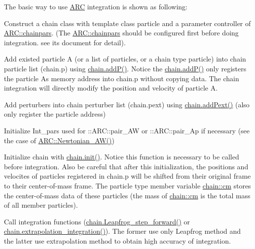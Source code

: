 The basic way to use \hyperlink{namespaceARC}{A\+RC} integration is shown as following\+:
\begin{DoxyEnumerate}
\item Construct a chain class with template class particle and a parameter controller of \hyperlink{classARC_1_1chainpars}{A\+R\+C\+::chainpars}. (The \hyperlink{classARC_1_1chainpars}{A\+R\+C\+::chainpars} should be configured first before doing integration. see its document for detail).
\item Add existed particle \textquotesingle{}A\textquotesingle{} (or a list of particles, or a chain type particle) into chain particle list (chain.\+p) using \hyperlink{classARC_1_1chain_a6af4a9c65329265a45f0210c104fa96a}{chain.\+add\+P()}. Notice the \hyperlink{classARC_1_1chain_a6af4a9c65329265a45f0210c104fa96a}{chain.\+add\+P()} only registers the particle A\textquotesingle{}s memory address into chain.\+p without copying data. The chain integration will directly modify the position and velocity of particle A.
\item Add perturbers into chain perturber list (chain.\+pext) using \hyperlink{classARC_1_1chain_ab6892980b326bd0bbe8a873a71892801}{chain.\+add\+Pext()} (also only register the particle address)
\item Initialize Int\+\_\+pars used for \+::\+A\+R\+C\+::pair\+\_\+\+AW or \+::\+A\+R\+C\+::pair\+\_\+\+Ap if necessary (see the case of \hyperlink{namespaceNTA_aecd205ef07c4302cd04d04218c4426e6}{A\+R\+C\+::\+Newtonian\+\_\+\+A\+W()})
\item Initialize chain with \hyperlink{classARC_1_1chain_a3fe37720ceb48c14905c92d3e25e71a4}{chain.\+init()}. Notice this function is necessary to be called before integration. Also be careful that after this initialization, the positions and velocites of particles registered in chain.\+p will be shifted from their original frame to their center-\/of-\/mass frame. The particle type member variable \hyperlink{classARC_1_1chain_a2eead75bd916fa7ffc05341645527847}{chain\+::cm} stores the center-\/of-\/mass data of these particles (the mass of \hyperlink{classARC_1_1chain_a2eead75bd916fa7ffc05341645527847}{chain\+::cm} is the total mass of all member particles).
\item Call integration functions (\hyperlink{classARC_1_1chain_aff3cd92c840d1bbbc903a8a07eb079d0}{chain.\+Leapfrog\+\_\+step\+\_\+forward()} or \hyperlink{classARC_1_1chain_ae4d0002cceee2397101a43b3755f927e}{chain.\+extrapolation\+\_\+integration()}). The former use only Leapfrog method and the latter use extrapolation method to obtain high accuracy of integration.

\end{DoxyEnumerate}
